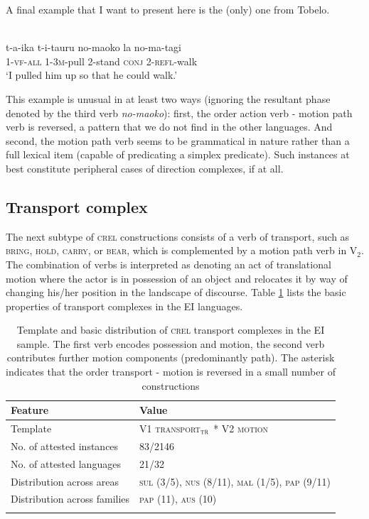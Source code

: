 A final example that I want to present here is the (only) one from Tobelo. 

\ea \label{Tobelo033}
\\
\gll t-a-ika t-i-tauru no-maoko la no-ma-tagi \\
\textsc{1}-\textsc{vf}-\textsc{all} \textsc{1}-\textsc{3}\textsc{m}-pull \textsc{2}-stand \textsc{conj} \textsc{2}-\textsc{refl}-walk \\
\glft `I pulled him up so that he could walk.' \\ 
\z

This example is unusual in at least two ways (ignoring the resultant phase denoted by the third verb \textit{no-maoko}): first, the order action verb - motion path verb is reversed, a pattern that we do not find in the other languages. And second, the motion path verb seems to be grammatical in nature rather than a full lexical item (capable of predicating a simplex predicate). Such instances at best constitute peripheral cases of direction complexes, if at all.

\subsection{Transport complex} \label{sec:transport}

The next subtype of \textsc{crel} constructions consists of a verb of transport, such as \textsc{bring}, \textsc{hold}, \textsc{carry}, or \textsc{bear}, which is complemented by a motion path verb in V$_2$. The combination of verbs is interpreted as denoting an act of translational motion where the actor is in possession of an object and relocates it by way of changing his/her position in the landscape of discourse. Table \ref{table:basiccreltransport} lists the basic properties of transport complexes in the EI languages. 

\begin{table}
\begin{tabular}{ll}
\lsptoprule
Feature&Value\tabularnewline
\hline
Template&V1 \textsc{transport$_{\textsc{tr}}$} * V2 \textsc{motion}\tabularnewline
No. of attested instances& 83/2146 \tabularnewline
No. of attested languages& 21/32 \tabularnewline
Distribution across areas& \textsc{sul} (3/5), \textsc{nus} (8/11), \textsc{mal} (1/5), \textsc{pap} (9/11) \tabularnewline
Distribution across families& \textsc{pap} (11), \textsc{aus} (10) \tabularnewline
\lspbottomrule
\end{tabular}
\caption[Template and basic distribution of \textsc{crel} transport complexes]{Template and basic distribution of \textsc{crel} transport complexes in the EI sample. The first verb encodes possession and motion, the second verb contributes further motion components (predominantly path). The asterisk indicates that the order transport - motion is reversed in a small number of constructions}
\label{table:basiccreltransport}
\end{table}

